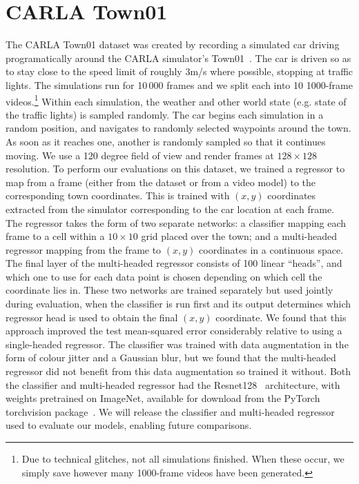 \section{CARLA Town01}
The CARLA Town01 dataset was created by recording a simulated car driving programatically around the CARLA simulator's Town01~\cite{dosovitskiy2017carla}. The car is driven so as to stay close to the speed limit of roughly $3$m/s where possible, stopping at traffic lights. The simulations run for 10\,000 frames and we split each into 10 1000-frame videos.\footnote{Due to technical glitches, not all simulations finished. When these occur, we simply save however many 1000-frame videos have been generated.} Within each simulation, the weather and other world state (e.g. state of the traffic lights) is sampled randomly. The car begins each simulation in a random position, and navigates to randomly selected waypoints around the town. As soon as it reaches one, another is randomly sampled so that it continues moving. We use a 120 degree field of view and render frames at $128\times128$ resolution.
%
To perform our evaluations on this dataset, we trained a regressor to map from a frame (either from the dataset or from a video model) to the corresponding town coordinates. This is trained with $(x,y)$ coordinates extracted from the simulator corresponding to the car location at each frame. The regressor takes the form of two separate networks: a classifier mapping each frame to a cell within a $10\times10$ grid placed over the town; and a multi-headed regressor mapping from the frame to $(x,y)$ coordinates in a continuous space. The final layer of the multi-headed regressor consists of 100 linear ``heads'', and which one to use for each data point is chosen depending on which cell the coordinate lies in. These two networks are trained separately but used jointly during evaluation, when the classifier is run first and its output determines which regressor head is used to obtain the final $(x,y)$ coordinate. We found that this approach improved the test mean-squared error considerably relative to using a single-headed regressor. The classifier was trained with data augmentation in the form of colour jitter and a Gaussian blur, but we found that the multi-headed regressor did not benefit from this data augmentation so trained it without. Both the classifier and multi-headed regressor had the Resnet128~\citep{he2015deep} architecture, with weights pretrained on ImageNet, available for download from the PyTorch torchvision package~\citep{paszke2017automatic}. We will release the classifier and multi-headed regressor used to evaluate our models, enabling future comparisons.

